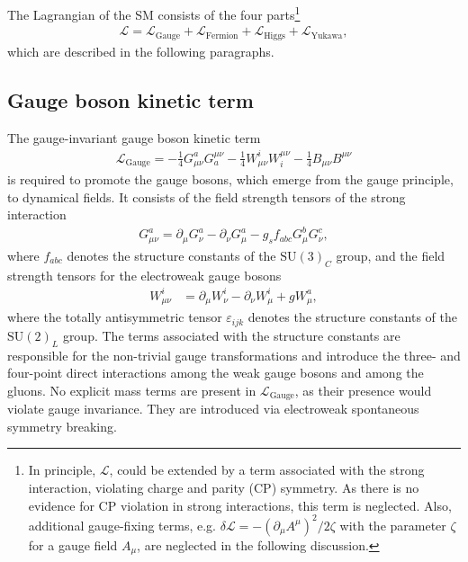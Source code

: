 The Lagrangian of the SM consists of the four parts\footnote{In principle, \(\mathcal{L}\), could be extended by a term associated with the strong interaction, violating charge and parity (CP) symmetry. As there is no evidence for CP violation in strong interactions, this term is neglected. Also, additional gauge-fixing terms, e.g. \(\delta \mathcal{L} = - (\partial_{\mu} A^{\mu})^2 / 2 \zeta\) with the parameter \(\zeta\) for a gauge field \(A_{\mu}\), are neglected in the following discussion.}
\begin{align}
    \mathcal{L} = \mathcal{L}_{\text{Gauge}} + \mathcal{L}_{\text{Fermion}} + \mathcal{L}_{\text{Higgs}} + \mathcal{L}_{\text{Yukawa}},
\end{align}
which are described in the following paragraphs.

\subsection{Gauge boson kinetic term}
\label{sec:sm:lagrangian:boson}
The gauge-invariant gauge boson kinetic term
\begin{align}
    \mathcal{L}_{\text{Gauge}} = - \frac{1}{4} G_{\mu\nu}^{a} G^{\mu\nu}_{a} - \frac{1}{4} W^{i}_{\mu\nu} W_{i}^{\mu\nu} - \frac{1}{4} B_{\mu\nu} B^{\mu\nu}
\end{align}
is required to promote the gauge bosons, which emerge from the gauge principle, to dynamical fields. It consists of the field strength tensors of the strong interaction
\begin{align}
    G_{\mu\nu}^{a} = \partial_{\mu} G_{\nu}^{a} - \partial_{\nu}G_{\mu}^{a} - g_s f_{abc} G_{\mu}^{b} G_{\nu}^{c},
\end{align}
where \(f_{abc}\) denotes the structure constants of the \(\textrm{SU}(3)_{C}\) group, and the field strength tensors for the electroweak gauge bosons
\begin{align}
    W^{i}_{\mu\nu} &= \partial_{\mu} W_{\nu}^{i} - \partial_{\nu} W_{\mu}^{i} + g W_{\mu}^a,
\end{align}
where the totally antisymmetric tensor \(\varepsilon_{ijk}\) denotes the structure constants of the \(\textrm{SU}(2)_{L}\) group. The terms associated with the structure constants are responsible for the non-trivial gauge transformations and introduce the three- and four-point direct interactions among the weak gauge bosons and among the gluons. No explicit mass terms are present in \(\mathcal{L}_{\text{Gauge}}\), as their presence would violate gauge invariance. They are introduced via electroweak spontaneous symmetry breaking.

